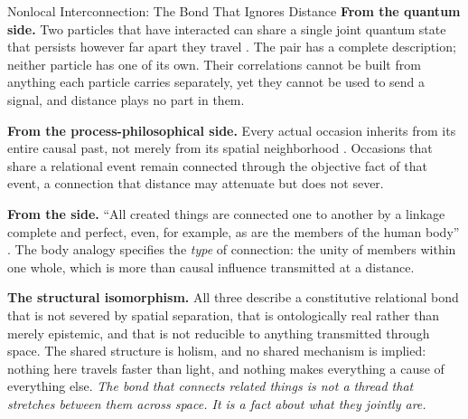 \begin{convergencemoment}{Nonlocal Interconnection: The Bond That Ignores Distance}
\textbf{From the quantum side.} Two particles that have interacted can share a single joint quantum state that persists however far apart they travel \citep{Bell1964,Aspect1982,Zeilinger2023Nobel}. The pair has a complete description; neither particle has one of its own. Their correlations cannot be built from anything each particle carries separately, yet they cannot be used to send a signal, and distance plays no part in them.

\textbf{From the process-philosophical side.} Every actual occasion inherits from its entire causal past, not merely from its spatial neighborhood \citep{Whitehead1929}. Occasions that share a relational event remain connected through the objective fact of that event, a connection that distance may attenuate but does not sever.

\textbf{From the \bahai side.} ``All created things are connected one to another by a linkage complete and perfect, even, for example, as are the members of the human body'' \citep[\S 21]{SelectionsAbdul}. The body analogy specifies the \emph{type} of connection: the unity of members within one whole, which is more than causal influence transmitted at a distance.

\textbf{The structural isomorphism.} All three describe a constitutive relational bond that is not severed by spatial separation, that is ontologically real rather than merely epistemic, and that is not reducible to anything transmitted through space. The shared structure is holism, and no shared mechanism is implied: nothing here travels faster than light, and nothing makes everything a cause of everything else. \emph{The bond that connects related things is not a thread that stretches between them across space. It is a fact about what they jointly are.}
\end{convergencemoment}
